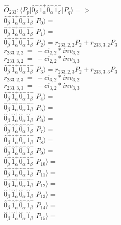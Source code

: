 \documentclass[14pt]{article}
\begin{document}
    $\hat{O}_{233}:  \langle{P_p}\vert \hat{0}_{\beta}^{+}\hat{1}_{\alpha}^{+}\hat{0}_{\alpha}^{-}\hat{1}_{\beta}^{-} \vert{P_q}\rangle => $ \\ 
    $ \hat{0}_{\beta}^{+}\hat{1}_{\alpha}^{+}\hat{0}_{\alpha}^{-}\hat{1}_{\beta}^{-} \vert{P_{0}}\rangle =  $ \\ 
    $ \hat{0}_{\beta}^{+}\hat{1}_{\alpha}^{+}\hat{0}_{\alpha}^{-}\hat{1}_{\beta}^{-} \vert{P_{1}}\rangle =  $ \\ 
    $ \hat{0}_{\beta}^{+}\hat{1}_{\alpha}^{+}\hat{0}_{\alpha}^{-}\hat{1}_{\beta}^{-} \vert{P_{2}}\rangle = {r}_{233,2,2}P_{2}+{r}_{233,3,2}P_{3} $ \\ 
    ${r}_{233,2,2}\ =\ -{ci}_{2,2}*{inv}_{3,2} $ \\ 
    ${r}_{233,3,2}\ =\ -{ci}_{2,2}*{inv}_{3,3} $ \\ 
    $ \hat{0}_{\beta}^{+}\hat{1}_{\alpha}^{+}\hat{0}_{\alpha}^{-}\hat{1}_{\beta}^{-} \vert{P_{3}}\rangle = {r}_{233,2,3}P_{2}+{r}_{233,3,3}P_{3} $ \\ 
    ${r}_{233,2,3}\ =\ -{ci}_{3,2}*{inv}_{3,2} $ \\ 
    ${r}_{233,3,3}\ =\ -{ci}_{3,2}*{inv}_{3,3} $ \\ 
    $ \hat{0}_{\beta}^{+}\hat{1}_{\alpha}^{+}\hat{0}_{\alpha}^{-}\hat{1}_{\beta}^{-} \vert{P_{4}}\rangle =  $ \\ 
    $ \hat{0}_{\beta}^{+}\hat{1}_{\alpha}^{+}\hat{0}_{\alpha}^{-}\hat{1}_{\beta}^{-} \vert{P_{5}}\rangle =  $ \\ 
    $ \hat{0}_{\beta}^{+}\hat{1}_{\alpha}^{+}\hat{0}_{\alpha}^{-}\hat{1}_{\beta}^{-} \vert{P_{6}}\rangle =  $ \\ 
    $ \hat{0}_{\beta}^{+}\hat{1}_{\alpha}^{+}\hat{0}_{\alpha}^{-}\hat{1}_{\beta}^{-} \vert{P_{7}}\rangle =  $ \\ 
    $ \hat{0}_{\beta}^{+}\hat{1}_{\alpha}^{+}\hat{0}_{\alpha}^{-}\hat{1}_{\beta}^{-} \vert{P_{8}}\rangle =  $ \\ 
    $ \hat{0}_{\beta}^{+}\hat{1}_{\alpha}^{+}\hat{0}_{\alpha}^{-}\hat{1}_{\beta}^{-} \vert{P_{9}}\rangle =  $ \\ 
    $ \hat{0}_{\beta}^{+}\hat{1}_{\alpha}^{+}\hat{0}_{\alpha}^{-}\hat{1}_{\beta}^{-} \vert{P_{10}}\rangle =  $ \\ 
    $ \hat{0}_{\beta}^{+}\hat{1}_{\alpha}^{+}\hat{0}_{\alpha}^{-}\hat{1}_{\beta}^{-} \vert{P_{11}}\rangle =  $ \\ 
    $ \hat{0}_{\beta}^{+}\hat{1}_{\alpha}^{+}\hat{0}_{\alpha}^{-}\hat{1}_{\beta}^{-} \vert{P_{12}}\rangle =  $ \\ 
    $ \hat{0}_{\beta}^{+}\hat{1}_{\alpha}^{+}\hat{0}_{\alpha}^{-}\hat{1}_{\beta}^{-} \vert{P_{13}}\rangle =  $ \\ 
    $ \hat{0}_{\beta}^{+}\hat{1}_{\alpha}^{+}\hat{0}_{\alpha}^{-}\hat{1}_{\beta}^{-} \vert{P_{14}}\rangle =  $ \\ 
    $ \hat{0}_{\beta}^{+}\hat{1}_{\alpha}^{+}\hat{0}_{\alpha}^{-}\hat{1}_{\beta}^{-} \vert{P_{15}}\rangle =  $ \\ 
    
\end{document}
